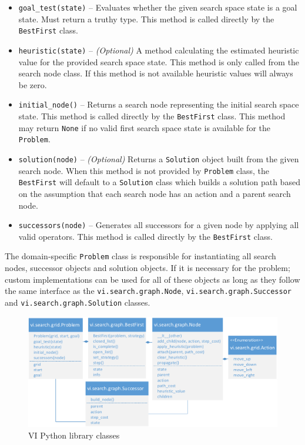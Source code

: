 \begin{itemize}
\item \texttt{goal\_test(state)} -- Evaluates whether the given search space state is a goal state. Must return a truthy type. This method is called directly by the \texttt{BestFirst} class.
\item \texttt{heuristic(state)} -- \textit{(Optional)} A method calculating the estimated heuristic value for the provided search space state. This method is only called from the search node class. If this method is not available heuristic values will always be zero.
\item \texttt{initial\_node()} -- Returns a search node representing the initial search space state. This method is called directly by the \texttt{BestFirst} class. This method may return \texttt{None} if no valid first search space state is available for the \texttt{Problem}.
\item \texttt{solution(node)} -- \textit{(Optional)} Returns a \texttt{Solution} object built from the given search node. When this method is not provided by \texttt{Problem} class, the \texttt{BestFirst} will default to a \texttt{Solution} class which builds a solution path based on the assumption that each search node has an action and a parent search node.
\item \texttt{successors(node)} -- Generates all successors for a given node by applying all valid operators. This method is called directly by the \texttt{BestFirst} class.
\end{itemize}

The domain-specific \texttt{Problem} class is responsible for instantiating all search nodes, successor objects and solution objects. If it is necessary for the problem; custom implementations can be used for all of these objects as long as they follow the same interface as the \texttt{vi.search.graph.Node}, \texttt{vi.search.graph.Successor} and \texttt{vi.search.graph.Solution} classes.

\begin{figure}[H]
\includegraphics[scale=0.7]{images/vi_class_hierarchy}
\caption{VI Python library classes}
\label{figure:vi_classes}
\end{figure}

